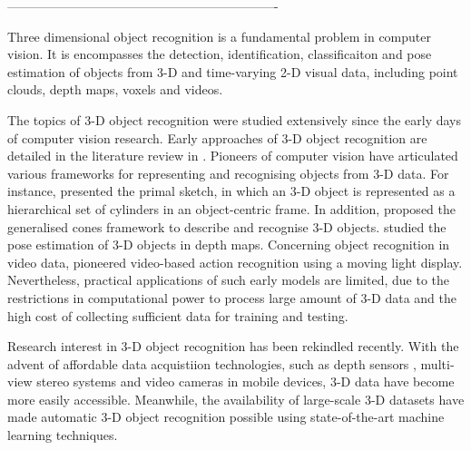 \documentclass[10pt, a4paper]{article}
\begin{document}
 ----------------------------------------------------------------

Three dimensional object recognition is a fundamental problem in computer vision. It is encompasses the detection, identification, classificaiton and pose estimation of objects from 3-D and time-varying 2-D visual data, including point clouds, depth maps, voxels and videos. 

The topics of 3-D object recognition were studied extensively since the early days of computer vision research. Early approaches of 3-D object recognition are detailed in the literature review in \cite{Besl1985}. 
Pioneers of computer vision have articulated various frameworks for representing and recognising objects from 3-D data.
For instance, \cite{Marr1978} presented the primal sketch, in which an 3-D object is represented as a hierarchical set of cylinders in an object-centric frame. 
In addition, \cite{Nevatia1977} proposed the generalised cones framework to describe and recognise 3-D objects. \cite{Bolles1983} studied the pose estimation of 3-D objects in depth maps.
Concerning object recognition in video data, \cite{Johansson1973} pioneered video-based action recognition using a moving light display. Nevertheless, practical applications of such early models are limited, due to the restrictions in computational power to process large amount of 3-D data and the high cost of collecting sufficient data for training and testing. 



Research interest in 3-D object recognition has been rekindled recently.    
With the advent of affordable data acquistiion technologies, such as depth sensors \cite{Shotton2011}, multi-view stereo systems \cite{Vogiatzis2011} and video cameras in mobile devices, 3-D data have become more easily accessible. Meanwhile, the availability of large-scale 3-D datasets have made automatic 3-D object recognition possible using state-of-the-art machine learning techniques.  
\end{document}
